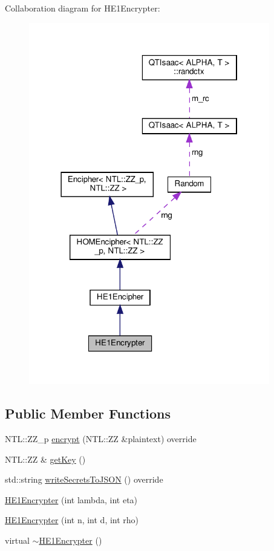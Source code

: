 Collaboration diagram for H\+E1\+Encrypter\+:
\nopagebreak
\begin{figure}[H]
\begin{center}
\leavevmode
\includegraphics[width=298pt]{classHE1Encrypter__coll__graph}
\end{center}
\end{figure}
\subsection*{Public Member Functions}
\begin{DoxyCompactItemize}
\item 
N\+T\+L\+::\+Z\+Z\+\_\+p \hyperlink{classHE1Encrypter_afc178d8e27a1263bef824bfc8960dbc0}{encrypt} (N\+T\+L\+::\+ZZ \&plaintext) override
\item 
N\+T\+L\+::\+ZZ \& \hyperlink{classHE1Encrypter_a014c9eca9d9979fa45dad79b355a95cc}{get\+Key} ()
\item 
std\+::string \hyperlink{classHE1Encrypter_a05627c66faf89c133a24fa7bb4553ef2}{write\+Secrets\+To\+J\+S\+ON} () override
\item 
\hyperlink{classHE1Encrypter_a4126c0700e63763f7f239876a2196f54}{H\+E1\+Encrypter} (int lambda, int eta)
\item 
\hyperlink{classHE1Encrypter_a3cce07a63783a523afcf6905e2df4b93}{H\+E1\+Encrypter} (int n, int d, int rho)
\item 
virtual \hyperlink{classHE1Encrypter_aac874cc80eb19b455bd1ead547cf2b15}{$\sim$\+H\+E1\+Encrypter} ()
\end{DoxyCompactItemize}

